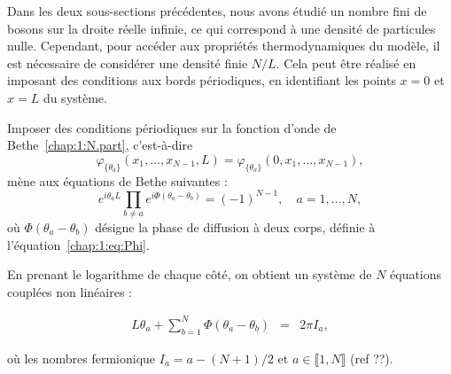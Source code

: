 Dans les deux sous-sections précédentes, nous avons étudié un nombre fini de bosons sur la droite réelle infinie, ce qui correspond à une densité de particules nulle. Cependant, pour accéder aux propriétés thermodynamiques du modèle, il est nécessaire de considérer une densité finie $N/L$. Cela peut être réalisé en imposant des conditions aux bords périodiques, en identifiant les points $x = 0$ et $x = L$ du système.

Imposer des conditions périodiques sur la fonction d’onde de Bethe~\eqref{chap:1:N.part}, c’est-à-dire
\[
\varphi_{\{\theta_a\}}(x_1, \dots, x_{N-1}, L) = \varphi_{\{\theta_a\}}(0, x_1, \dots, x_{N-1}),
\]
mène aux équations de Bethe suivantes :
\begin{equation}
e^{i \theta_a L} \prod_{b \ne a} e^{i \Phi(\theta_a - \theta_b)} = (-1)^{N-1}, \quad a = 1, \dots, N,
\label{eq:bethe_exp}
\end{equation}
où $\Phi(\theta_a - \theta_b)$ désigne la phase de diffusion à deux corps, définie à l'équation~\eqref{chap:1:eq:Phi}.

En prenant le logarithme de chaque côté, on obtient un système de $N$ équations couplées non linéaires :

\begin{eqnarray}\label{chap:1:eq:EBA}
	L \theta_a + \sum_{b = 1}^N \Phi ( \theta_a - \theta_b ) & = & 2\pi I_a ,	
\end{eqnarray}

où les nombres fermionique $I_a = a - (N+1)/2$ et $a \in \llbracket 1 , N  \rrbracket$ (ref ??).